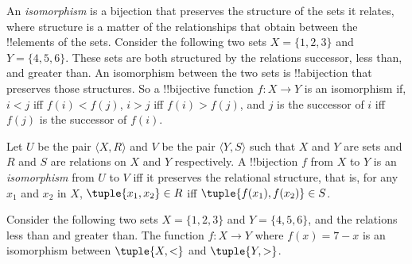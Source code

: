 \documentclass[../../../include/open-logic-section]{subfiles}
\begin{document}

\begin{explain}
An \emph{isomorphism} is a bijection that preserves the structure of
the sets it relates, where structure is a matter of the relationships
that obtain between the !!{element}s of the sets. Consider the
following two sets $X=\{1,2,3\}$ and $Y=\{4,5,6\}$. These sets are
both structured by the relations successor, less than, and greater
than. An isomorphism between the two sets is !!a{bijection} that
preserves those structures. So a !!{bijective} function $f \colon X
\to Y$ is an isomorphism if, $i<j$ iff $f(i)<f(j)$, $i>j$ iff
$f(i)>f(j)$, and $j$ is the successor of $i$ iff $f(j)$ is the
successor of $f(i)$.
\end{explain}

\begin{defn}
Let $U$ be the pair $\langle X, R\rangle$ and $V$ be the pair $\langle
Y, S\rangle$ such that $X$ and $Y$ are sets and $R$ and $S$ are
relations on $X$ and $Y$ respectively. A !!{bijection} $f$ from $X$ to
$Y$ is an \emph{isomorphism} from $U$ to $V$ iff it preserves the
relational structure, that is, for any $x_{1}$ and $x_{2}$ in $X$,
$\tuple{x_1,x_2} \in R$ iff $\tuple{f(x_1),f(x_2)} \in S$.
\end{defn}

\begin{ex}
Consider the following two sets $X=\{1,2,3\}$ and $Y=\{4,5,6\}$, and
the relations less than and greater than. The function $f\colon X \to
Y$ where $f(x) = 7-x$ is an isomorphism between $\tuple{X,<}$ and
$\tuple{Y,>}$.
\end{ex}
\end{document}
